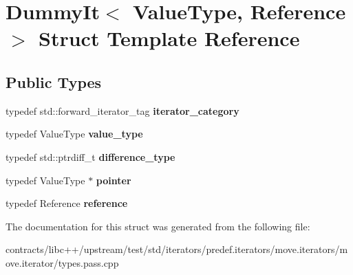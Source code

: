 \hypertarget{struct_dummy_it}{}\section{Dummy\+It$<$ Value\+Type, Reference $>$ Struct Template Reference}
\label{struct_dummy_it}
\subsection*{Public Types}
\begin{DoxyCompactItemize}
\item 
\mbox{\label{struct_dummy_it_a417a2619669275adee76a35a3c978d4f}} 
typedef std\+::forward\+\_\+iterator\+\_\+tag {\bfseries iterator\+\_\+category}
\item 
\mbox{\label{struct_dummy_it_a2f1cc0b758e398ce51a78e65793faf93}} 
typedef Value\+Type {\bfseries value\+\_\+type}
\item 
\mbox{\label{struct_dummy_it_a5f8c8e6075712dc1f753c11bc16ce29f}} 
typedef std\+::ptrdiff\+\_\+t {\bfseries difference\+\_\+type}
\item 
\mbox{\label{struct_dummy_it_a8a2f7e87cf1fd539309eb373e1c80874}} 
typedef Value\+Type $\ast$ {\bfseries pointer}
\item 
\mbox{\label{struct_dummy_it_ad71ac3ae9b5e8996272fe96986b4d6ad}} 
typedef Reference {\bfseries reference}
\end{DoxyCompactItemize}


The documentation for this struct was generated from the following file\+:\begin{DoxyCompactItemize}
\item 
contracts/libc++/upstream/test/std/iterators/predef.\+iterators/move.\+iterators/move.\+iterator/types.\+pass.\+cpp\end{DoxyCompactItemize}
